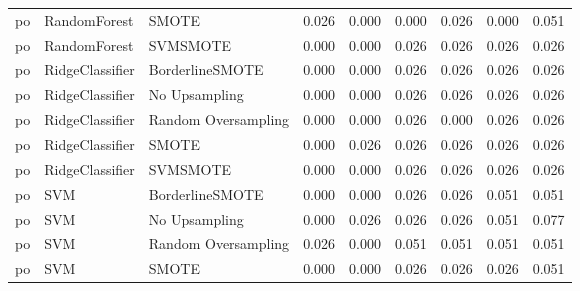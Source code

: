 \begin{tabular}{lllllllll}
      po &                 RandomForest &               SMOTE & 0.026 &                     0.000 &                 0.000 &                  0.026 &                                   0.000 &     0.051 \\
      po &                 RandomForest &            SVMSMOTE & 0.000 &                     0.000 &                 0.026 &                  0.026 &                                   0.026 &     0.026 \\
      po &              RidgeClassifier &     BorderlineSMOTE & 0.000 &                     0.000 &                 0.026 &                  0.026 &                                   0.026 &     0.026 \\
      po &              RidgeClassifier &       No Upsampling & 0.000 &                     0.000 &                 0.026 &                  0.026 &                                   0.026 &     0.026 \\
      po &              RidgeClassifier & Random Oversampling & 0.000 &                     0.000 &                 0.026 &                  0.000 &                                   0.026 &     0.026 \\
      po &              RidgeClassifier &               SMOTE & 0.000 &                     0.026 &                 0.026 &                  0.026 &                                   0.026 &     0.026 \\
      po &              RidgeClassifier &            SVMSMOTE & 0.000 &                     0.000 &                 0.026 &                  0.026 &                                   0.026 &     0.026 \\
      po &                          SVM &     BorderlineSMOTE & 0.000 &                     0.000 &                 0.026 &                  0.026 &                                   0.051 &     0.051 \\
      po &                          SVM &       No Upsampling & 0.000 &                     0.026 &                 0.026 &                  0.026 &                                   0.051 &     0.077 \\
      po &                          SVM & Random Oversampling & 0.026 &                     0.000 &                 0.051 &                  0.051 &                                   0.051 &     0.051 \\
      po &                          SVM &               SMOTE & 0.000 &                     0.000 &                 0.026 &                  0.026 &                                   0.026 &     0.051 \\

\end{tabular}
